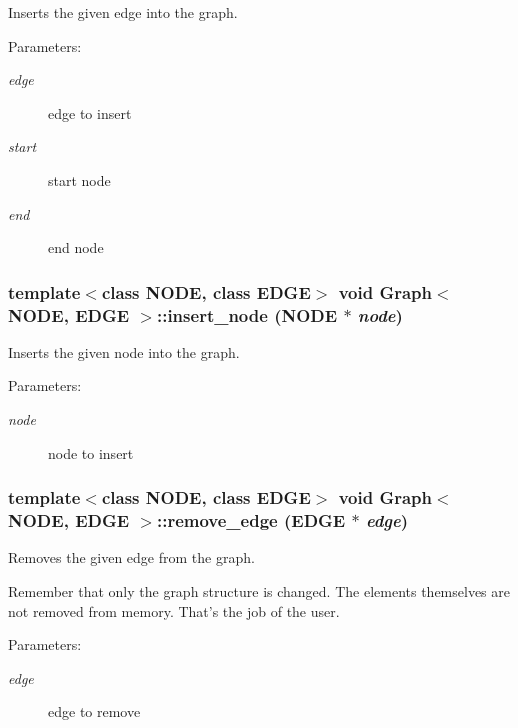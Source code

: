 Inserts the given edge into the graph. 

\begin{Desc}
\item[Parameters:]
\begin{description}
\item[{\em edge}]edge to insert \item[{\em start}]start node \item[{\em end}]end node\end{description}
\end{Desc}
\subsubsection{\setlength{\rightskip}{0pt plus 5cm}template$<$class NODE, class EDGE$>$ void {\bf Graph}$<$ NODE, EDGE $>$::insert\_\-node (NODE $\ast$ {\em node})}\label{classGraph_Grapha3}


Inserts the given node into the graph. 

\begin{Desc}
\item[Parameters:]
\begin{description}
\item[{\em node}]node to insert\end{description}
\end{Desc}
\subsubsection{\setlength{\rightskip}{0pt plus 5cm}template$<$class NODE, class EDGE$>$ void {\bf Graph}$<$ NODE, EDGE $>$::remove\_\-edge (EDGE $\ast$ {\em edge})}\label{classGraph_Grapha4}


Removes the given edge from the graph. 

Remember that only the graph structure is changed. The elements themselves are not removed from memory. That's the job of the user. \begin{Desc}
\item[Parameters:]
\begin{description}
\item[{\em edge}]edge to remove\end{description}
\end{Desc}
